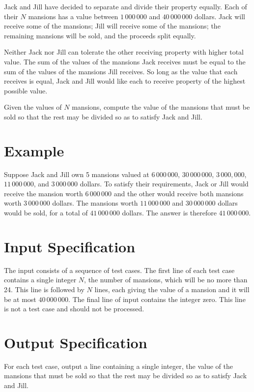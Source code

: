 
Jack and Jill have decided to separate and divide their property equally. Each of their $N$ mansions
has a value between $1\,000\,000$ and $40\,000\,000$ dollars. Jack will receive some of the
mansions; Jill will receive some of the mansions; the remaining mansions will be sold, and the
proceeds split equally.

Neither Jack nor Jill can tolerate the other receiving property with higher total value. The sum of
the values of the mansions Jack receives must be equal to the sum of the values of the mansions Jill
receives.  So long as the value that each receives is equal, Jack and Jill would like each to
receive property of the highest possible value.

Given the values of $N$ mansions, compute the value of the mansions that must be sold so that the
rest may be divided so as to satisfy Jack and Jill.

\section*{Example}
Suppose Jack and Jill own 5 mansions valued at $6\,000\,000$, $30\,000\,000$, $3\,000,000$,
$11\,000\,000$, and $3\,000\,000$ dollars.  To satisfy their requirements, Jack or Jill would
receive the mansion worth $6\,000\,000$ and the other would receive both mansions worth
$3\,000\,000$ dollars. The mansions worth $11\,000\,000$ and $30\,000\,000$ dollars would be sold,
for a total of $41\,000\,000$ dollars.  The answer is therefore $41\,000\,000$.

\section*{Input Specification}
The input consists of a sequence of test cases. The first line of each test case contains a single
integer $N$, the number of mansions, which will be no more than 24. This line is followed by
$N$ lines, each giving the value of a mansion and it will be at most $40\,000\,000$. The final line of input contains the integer
zero. This line is not a test case and should not be processed.

\section*{Output Specification}
For each test case, output a line containing a single integer, the value of the mansions that must
be sold so that the rest may be divided so as to satisfy Jack and Jill.
